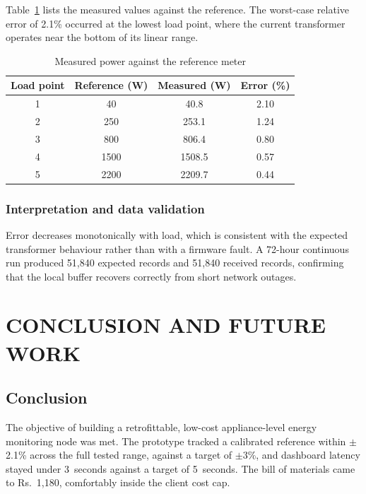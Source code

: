 \documentclass[12pt,a4paper]{report}
\begin{document}
Table~\ref{tab:results} lists the measured values against the reference. The
worst-case relative error of 2.1\% occurred at the lowest load point, where the
current transformer operates near the bottom of its linear range.

\begin{table}[H]
  \centering
  \caption{Measured power against the reference meter}
  \label{tab:results}
  \begin{tabular}{|c|c|c|c|}
    \hline
    \textbf{Load point} & \textbf{Reference (W)} & \textbf{Measured (W)} & \textbf{Error (\%)} \\
    \hline
    1 & 40   & 40.8   & 2.10 \\
    \hline
    2 & 250  & 253.1  & 1.24 \\
    \hline
    3 & 800  & 806.4  & 0.80 \\
    \hline
    4 & 1500 & 1508.5 & 0.57 \\
    \hline
    5 & 2200 & 2209.7 & 0.44 \\
    \hline
  \end{tabular}
\end{table}

\subsection{Interpretation and data validation}

Error decreases monotonically with load, which is consistent with the expected
transformer behaviour rather than with a firmware fault. A 72-hour continuous
run produced 51,840 expected records and 51,840 received records, confirming
that the local buffer recovers correctly from short network outages.

\chapter{CONCLUSION AND FUTURE WORK}

\section{Conclusion}

The objective of building a retrofittable, low-cost appliance-level energy
monitoring node was met. The prototype tracked a calibrated reference within
$\pm$2.1\% across the full tested range, against a target of $\pm$3\%, and
dashboard latency stayed under 3~seconds against a target of 5~seconds. The
bill of materials came to Rs.~1,180, comfortably inside the client
cost cap.
\end{document}
